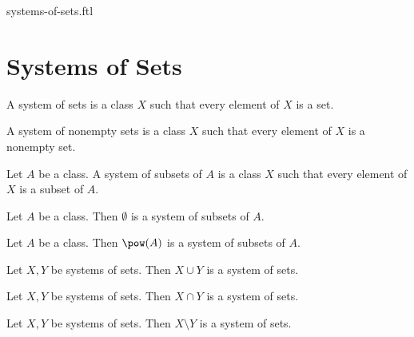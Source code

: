 \documentclass{naproche-library}
\begin{document}
\begin{smodule}{systems-of-sets.ftl}

  \section*{Systems of Sets}

  \begin{definition}[forthel,id=FOUNDATIONS_10_5805323570905088]
    A system of sets is a class $X$ such that every element of $X$ is a set.
  \end{definition}

  \begin{definition}[forthel,id=FOUNDATIONS_10_1631952387964928]
    A system of nonempty sets is a class $X$ such that every element of $X$ is a nonempty set.
  \end{definition}

  \begin{definition}[forthel,id=FOUNDATIONS_10_943381479948288]
    Let $A$ be a class.
    A system of subsets of $A$ is a class $X$ such that every element of $X$ is a subset of $A$.
  \end{definition}

  \begin{proposition}[forthel,id=FOUNDATIONS_10_8268633648136192]
    Let $A$ be a class.
    Then $\emptyset$ is a system of subsets of $A$.
  \end{proposition}

  \begin{proposition}[forthel,id=FOUNDATIONS_10_7546016869908480]
    Let $A$ be a class.
    Then $\pow(A)$ is a system of subsets of $A$.
  \end{proposition}

  \begin{proposition}
    Let $X, Y$ be systems of sets.
    Then $X \cup Y$ is a system of sets.
  \end{proposition}

  \begin{proposition}
    Let $X, Y$ be systems of sets.
    Then $X \cap Y$ is a system of sets.
  \end{proposition}

  \begin{proposition}
    Let $X, Y$ be systems of sets.
    Then $X \setminus Y$ is a system of sets.
  \end{proposition}



\end{smodule}
\end{document}
